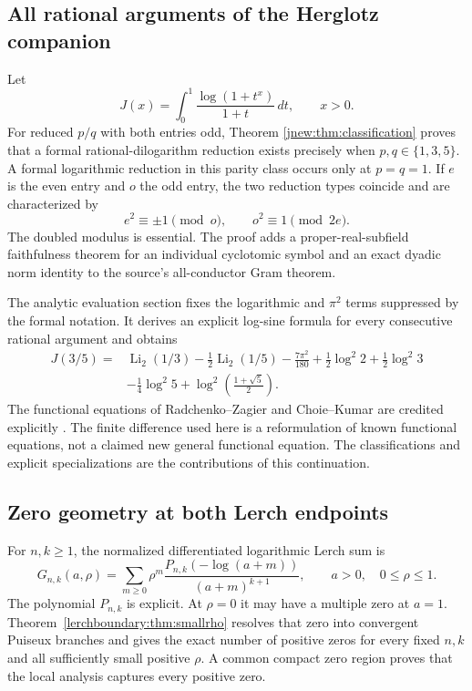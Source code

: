 \documentclass[11pt,a4paper]{article}
\theoremstyle{definition}
\theoremstyle{remark}
\numberwithin{equation}{section}
\DeclareMathOperator{\Li}{Li}
\begin{document}
\subsection{All rational arguments of the Herglotz companion}

Let
\[
J(x)=\int_0^1\frac{\log(1+t^x)}{1+t}\,dt,\qquad x>0.
\]
For reduced $p/q$ with both entries odd, Theorem
\ref{jnew:thm:classification} proves that a formal rational-dilogarithm
reduction exists precisely when $p,q\in\{1,3,5\}$. A formal logarithmic
reduction in this parity class occurs only at $p=q=1$. If $e$ is the
even entry and $o$ the odd entry, the two reduction types coincide and
are characterized by
\[
e^2\equiv\pm1\pmod o,\qquad o^2\equiv1\pmod{2e}.
\]
The doubled modulus is essential. The proof adds a proper-real-subfield
faithfulness theorem for an individual cyclotomic symbol and an exact
dyadic norm identity to the source's all-conductor Gram theorem.

The analytic evaluation section fixes the logarithmic and $\pi^2$
terms suppressed by the formal notation. It derives an explicit
log-sine formula for every consecutive rational argument and obtains
\[
\begin{aligned}
J(3/5)={}&\Li_2(1/3)-\tfrac12\Li_2(1/5)-\tfrac{7\pi^2}{180}
 +\tfrac12\log^2 2+\tfrac12\log^2 3\\
&-\tfrac14\log^2 5+\log^2\left(\tfrac{1+\sqrt5}{2}\right).
\end{aligned}
\]
The functional equations of Radchenko--Zagier and Choie--Kumar are
credited explicitly \cite{RadchenkoZagier,ChoieKumar2023}. The finite
difference used here is a reformulation of known functional equations,
not a claimed new general functional equation. The classifications and
explicit specializations are the contributions of this continuation.

\subsection{Zero geometry at both Lerch endpoints}

For $n,k\geq1$, the normalized differentiated logarithmic Lerch sum is
\[
G_{n,k}(a,\rho)=\sum_{m\geq0}\rho^m
\frac{P_{n,k}(-\log(a+m))}{(a+m)^{k+1}},\qquad a>0,\quad 0\leq\rho\leq1.
\]
The polynomial $P_{n,k}$ is explicit. At $\rho=0$ it may have a
multiple zero at $a=1$. Theorem~\ref{lerchboundary:thm:smallrho}
resolves that zero into convergent Puiseux branches and gives the exact
number of positive zeros for every fixed $n,k$ and all sufficiently
small positive $\rho$. A common compact zero region proves that the
local analysis captures every positive zero.
\end{document}
